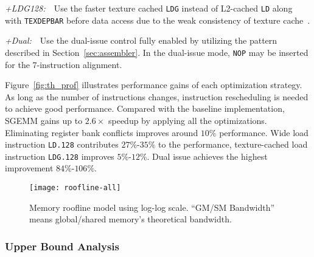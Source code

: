 {\it +LDG128:}~~Use the faster texture cached {\tt LDG} instead of L2-cached {\tt LD} along with {\tt TEXDEPBAR} before data access due to the weak consistency of texture cache~\cite{lukyanov2014efficient}.

{\it +Dual:}~~Use the dual-issue control fully enabled by utilizing the pattern described in Section~\ref{sec:assembler}.
In the dual-issue mode, {\tt NOP} may be inserted for the 7-instruction alignment.

Figure~\ref{fig:th_prof} illustrates performance gains of each optimization strategy.
As long as the number of instructions changes, instruction rescheduling is needed to achieve good performance.
Compared with the baseline implementation, SGEMM gains up to $2.6\times$ speedup by applying all the optimizations.
Eliminating register bank conflicts improves around $10\%$ performance. 
Wide load instruction {\tt LD.128} contributes $27\%$-$35\%$ to the performance, texture-cached load instruction {\tt LDG.128} improves $5\%$-$12\%$.
Dual issue achieves the highest improvement $84\%$-$106\%$.


\begin{figure}[htbp]
\begin{center}
\texttt{[image: roofline-all]}
    \caption{\small Memory roofline model using log-log scale. ``GM/SM Bandwidth'' means global/shared memory's theoretical
    bandwidth.} %
\label{fig:roofline_all}
\end{center}
\end{figure}



\subsubsection{Upper Bound Analysis}

